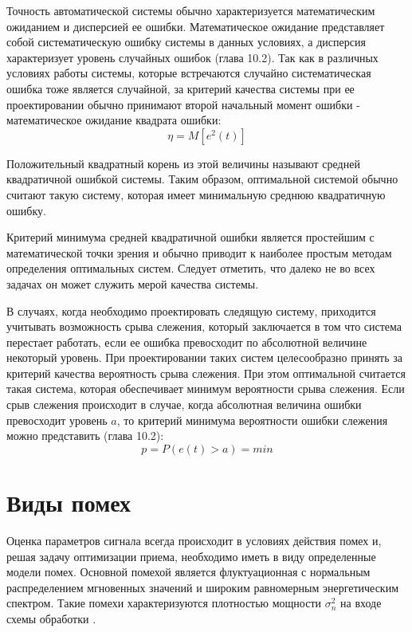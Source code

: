 Точность автоматической системы обычно характеризуется математическим ожиданием и дисперсией ее ошибки.
Математическое ожидание представляет собой систематическую ошибку системы в данных условиях, а дисперсия
характеризует уровень случайных ошибок \cite{pugachev} (глава 10.2). Так как в различных условиях работы
системы, которые встречаются случайно систематическая ошибка тоже является случайной, за критерий качества
системы при ее проектировании обычно принимают второй начальный момент ошибки - математическое ожидание
квадрата ошибки:
\begin{equation}
	\label{eq:stat_err_prob}
	\eta = M[e^2(t)]
\end{equation}

Положительный квадратный корень из этой величины называют средней квадратичной ошибкой системы. Таким образом,
оптимальной системой обычно считают такую систему, которая имеет минимальную среднюю квадратичную ошибку.

Критерий минимума средней квадратичной ошибки является простейшим с математической точки зрения и обычно приводит
к наиболее простым методам определения оптимальных систем. Следует отметить, что далеко не во всех задачах он может служить мерой
качества системы. 

В случаях, когда необходимо проектировать следящую систему, приходится учитывать возможность срыва слежения,
который заключается в том что система перестает работать, если ее ошибка превосходит по абсолютной величине некоторый
уровень. При проектировании таких систем целесообразно принять за критерий качества вероятность срыва слежения. При
этом оптимальной считается такая система, которая обеспечивает минимум вероятности срыва слежения. Если срыв слежения
происходит в случае, когда абсолютная величина ошибки превосходит уровень $a$, то критерий минимума вероятности ошибки
слежения можно представить \cite{pugachev} (глава 10.2):
\begin{equation}
	\label{eq:prob_lost_signal}
	p = P(e(t) > a) = min
\end{equation}

\section{Виды помех}
Оценка параметров сигнала всегда происходит в условиях действия помех и, решая задачу оптимизации приема,
необходимо иметь в виду определенные модели помех. Основной помехой является флуктуационная с нормальным
распределением мгновенных значений и широким равномерным энергетическим спектром. Такие помехи характеризуются
плотностью мощности ${\sigma_n^2}$ на входе схемы обработки \cite{pestryakov-book}.

